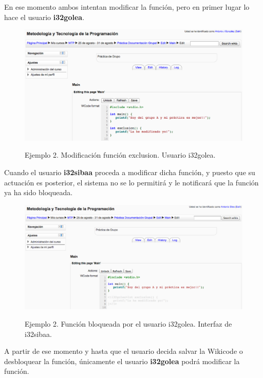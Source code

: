 \newpage

En ese momento ambos intentan modificar la función, pero en primer lugar lo hace el usuario \textbf{i32golea}.

\begin{figure}[h]
	\begin{center}
	\label{fig:ej1edit3}
	\includegraphics[scale=0.40]{./img/ej2edit3.eps}
	\caption{Ejemplo 2. Modificación función exclusion. Usuario i32golea.}
	\end{center}
\end{figure}

\newpage

Cuando el usuario \textbf{i32sibaa} proceda a modificar dicha función, y puesto que su actuación es posterior, el sistema no se lo permitirá y le notificará que la función ya ha sido bloqueada.

\begin{figure}[h]
	\begin{center}
	\label{fig:ej1edit4}
	\includegraphics[scale=0.40]{./img/ej2edit4.eps}
	\caption{Ejemplo 2. Función bloqueada por el usuario i32golea. Interfaz de i32sibaa.}
	\end{center}
\end{figure}

A partir de ese momento y hasta que el usuario decida salvar la Wikicode o desbloquear la función, únicamente el usuario \textbf{i32golea} podrá modificar la función.































